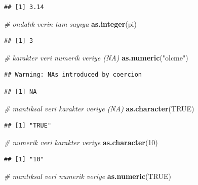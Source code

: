 \documentclass[
  oneside]{book}
\newenvironment{Shaded}{\begin{snugshade}}{\end{snugshade}}
\newcommand{\CommentTok}[1]{\textcolor[rgb]{0.56,0.35,0.01}{\textit{#1}}}
\newcommand{\ConstantTok}[1]{\textcolor[rgb]{0.56,0.35,0.01}{#1}}
\newcommand{\DecValTok}[1]{\textcolor[rgb]{0.00,0.00,0.81}{#1}}
\newcommand{\FunctionTok}[1]{\textcolor[rgb]{0.13,0.29,0.53}{\textbf{#1}}}
\newcommand{\NormalTok}[1]{#1}
\newcommand{\StringTok}[1]{\textcolor[rgb]{0.31,0.60,0.02}{#1}}
\begin{document}
\begin{verbatim}
## [1] 3.14
\end{verbatim}

\begin{Shaded}
\begin{Highlighting}[]
\CommentTok{\# ondalık verin tam sayıya}
\FunctionTok{as.integer}\NormalTok{(pi)}
\end{Highlighting}
\end{Shaded}

\begin{verbatim}
## [1] 3
\end{verbatim}

\begin{Shaded}
\begin{Highlighting}[]
\CommentTok{\# karakter veri numerik veriye (NA)}
\FunctionTok{as.numeric}\NormalTok{(}\StringTok{"olcme"}\NormalTok{)}
\end{Highlighting}
\end{Shaded}

\begin{verbatim}
## Warning: NAs introduced by coercion
\end{verbatim}

\begin{verbatim}
## [1] NA
\end{verbatim}

\begin{Shaded}
\begin{Highlighting}[]
\CommentTok{\# mantıksal veri karakter veriye (NA)}
\FunctionTok{as.character}\NormalTok{(}\ConstantTok{TRUE}\NormalTok{)}
\end{Highlighting}
\end{Shaded}

\begin{verbatim}
## [1] "TRUE"
\end{verbatim}

\begin{Shaded}
\begin{Highlighting}[]
\CommentTok{\# numerik veri karakter veriye}
\FunctionTok{as.character}\NormalTok{(}\DecValTok{10}\NormalTok{)}
\end{Highlighting}
\end{Shaded}

\begin{verbatim}
## [1] "10"
\end{verbatim}

\begin{Shaded}
\begin{Highlighting}[]
\CommentTok{\# mantıksal veri numerik veriye}
\FunctionTok{as.numeric}\NormalTok{(}\ConstantTok{TRUE}\NormalTok{)}
\end{Highlighting}
\end{Shaded}
\end{document}
